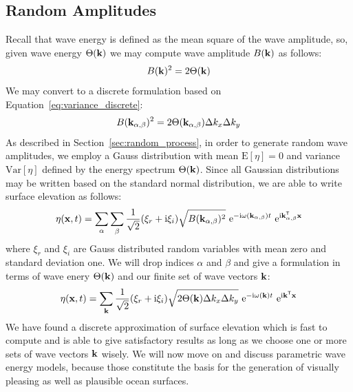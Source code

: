 \subsection{Random Amplitudes}
Recall that wave energy is defined as the mean square of the wave amplitude, so,
given wave energy $\Theta(\mathbf{k})$ we may compute wave amplitude 
$B(\mathbf{k})$ as follows:
\begin{equation}
 B(\mathbf{k})^2 = 2\Theta(\mathbf{k})
\end{equation}
We may convert to a discrete formulation based on 
Equation~\ref{eq:variance_discrete}:
\begin{equation}
 B(\mathbf{k}_{\alpha,\beta})^2 = 2\Theta(\mathbf{k}_{\alpha,\beta})\Delta k_x 
\Delta k_y
\end{equation}
As described in Section~\ref{sec:random_process}, in order to generate random 
wave amplitudes, we employ a Gauss distribution with mean $\mathrm{E}[\eta] 
= 0$ and variance $\mathrm{Var}[\eta]$ defined by the energy spectrum
$\Theta(\mathbf{k})$. Since all Gaussian distributions may be written based on 
the standard normal distribution, we are able to write surface elevation as 
follows:
\begin{equation}
 \eta(\mathbf{x}, t) = 
\sum_{\alpha}\sum_{\beta}\frac{1}{\sqrt{2}}(\xi_r+\mathrm{i}\xi_i)\sqrt{B(\mathbf{
k}_{\alpha,\beta})^2}~\mathrm{e}^{-\mathrm{i}\omega(\mathbf{k}_{\alpha,\beta}) 
t}~\mathrm{e}^{\mathrm{i}\mathbf{k}_{\alpha,\beta}^{\mathsf{T}}\mathbf{x}}
\end{equation}
where $\xi_r$ and $\xi_i$ are Gauss distributed random variables with mean zero 
and standard deviation one. We will drop indices $\alpha$ and $\beta$ and give 
a formulation in terms of wave enery $\Theta(\mathbf{k})$ and our finite set of 
wave vectors $\mathbf{k}$:
\begin{equation}
\label{eq:surface_elevation_discrete}
 \eta(\mathbf{x}, t) = 
\sum_{\mathbf{k}}\frac{1}{\sqrt{2}}(\xi_r+\mathrm{i}\xi_i)
\sqrt{2\Theta(\mathbf{k})\Delta k_x \Delta k_y} 
~\mathrm{e}^{-\mathrm{i}\omega(\mathbf{k})t}
~\mathrm{e}^{\mathrm{i}\mathbf{k}^{\mathsf{T}}\mathbf{x}}
\end{equation}
%
We have found a discrete approximation of surface elevation which is fast to 
compute and is able to give satisfactory results as long as we choose one or 
more sets of wave vectors $\mathbf{k}$ wisely. We will now move on and discuss
parametric wave energy models, because those constitute the basis for the
generation of visually pleasing as well as plausible ocean surfaces.
%
